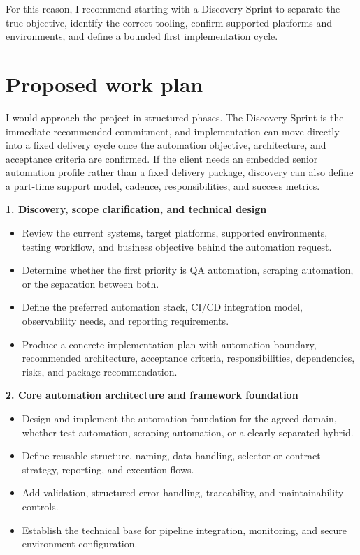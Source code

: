 \documentclass[11pt,a4paper]{article}
\begin{document}
For this reason, I recommend starting with a Discovery Sprint to separate the true objective, identify the correct tooling, confirm supported platforms and environments, and define a bounded first implementation cycle.\par

\section*{Proposed work plan}

I would approach the project in structured phases. The Discovery Sprint is the immediate recommended commitment, and implementation can move directly into a fixed delivery cycle once the automation objective, architecture, and acceptance criteria are confirmed. If the client needs an embedded senior automation profile rather than a fixed delivery package, discovery can also define a part-time support model, cadence, responsibilities, and success metrics.\par

\textbf{1. Discovery, scope clarification, and technical design}\par

\begin{itemize}
\item Review the current systems, target platforms, supported environments, testing workflow, and business objective behind the automation request.
\item Determine whether the first priority is QA automation, scraping automation, or the separation between both.
\item Define the preferred automation stack, CI/CD integration model, observability needs, and reporting requirements.
\item Produce a concrete implementation plan with automation boundary, recommended architecture, acceptance criteria, responsibilities, dependencies, risks, and package recommendation.
\end{itemize}

\textbf{2. Core automation architecture and framework foundation}\par

\begin{itemize}
\item Design and implement the automation foundation for the agreed domain, whether test automation, scraping automation, or a clearly separated hybrid.
\item Define reusable structure, naming, data handling, selector or contract strategy, reporting, and execution flows.
\item Add validation, structured error handling, traceability, and maintainability controls.
\item Establish the technical base for pipeline integration, monitoring, and secure environment configuration.
\end{itemize}
\end{document}
